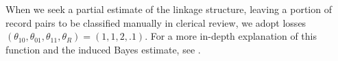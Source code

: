 \documentclass[ba]{imsart}
\begin{document}
When we seek a partial estimate of the linkage structure, leaving a portion of record pairs to be classified manually in clerical review, we adopt losses $(\theta_{10}, \theta_{01}, \theta_{11}, \theta_R) = (1, 1, 2, .1)$. For a more in-depth explanation of this function and the induced Bayes estimate, see \cite{sadinle_bayesian_2017}.
	
%	
	
\end{document}
